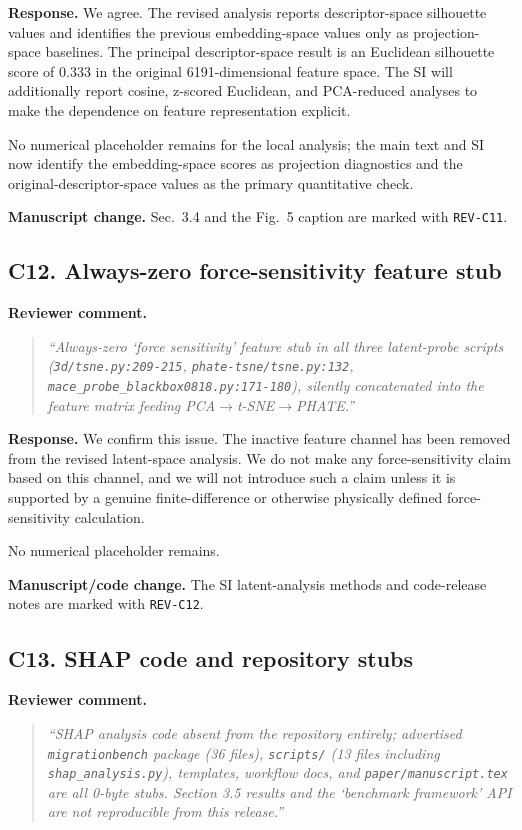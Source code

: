 \documentclass[11pt,a4paper]{article}
\begin{document}
\noindent\textbf{Response.}
We agree. The revised analysis reports descriptor-space silhouette values and identifies the previous embedding-space values only as projection-space baselines. The principal descriptor-space result is an Euclidean silhouette score of 0.333 in the original 6191-dimensional feature space. The SI will additionally report cosine, z-scored Euclidean, and PCA-reduced analyses to make the dependence on feature representation explicit.

No numerical placeholder remains for the local analysis; the main text and SI now identify the embedding-space scores as projection diagnostics and the original-descriptor-space values as the primary quantitative check.

\noindent\textbf{Manuscript change.}
Sec.~3.4 and the Fig.~5 caption are marked with \texttt{REV-C11}.

\subsection*{C12. Always-zero force-sensitivity feature stub}

\noindent\textbf{Reviewer comment.}
\begin{quote}
\itshape
``Always-zero `force sensitivity' feature stub in all three latent-probe scripts (\texttt{3d/tsne.py:209-215}, \texttt{phate-tsne/tsne.py:132}, \texttt{mace\_probe\_blackbox0818.py:171-180}), silently concatenated into the feature matrix feeding PCA$\rightarrow$t-SNE$\rightarrow$PHATE.''
\end{quote}

\noindent\textbf{Response.}
We confirm this issue. The inactive feature channel has been removed from the revised latent-space analysis. We do not make any force-sensitivity claim based on this channel, and we will not introduce such a claim unless it is supported by a genuine finite-difference or otherwise physically defined force-sensitivity calculation.

No numerical placeholder remains.

\noindent\textbf{Manuscript/code change.}
The SI latent-analysis methods and code-release notes are marked with \texttt{REV-C12}.

\subsection*{C13. SHAP code and repository stubs}

\noindent\textbf{Reviewer comment.}
\begin{quote}
\itshape
``SHAP analysis code absent from the repository entirely; advertised \texttt{migrationbench} package (36 files), \texttt{scripts/} (13 files including \texttt{shap\_analysis.py}), templates, workflow docs, and \texttt{paper/manuscript.tex} are all 0-byte stubs. Section 3.5 results and the `benchmark framework' API are not reproducible from this release.''
\end{quote}
\end{document}
